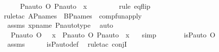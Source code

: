 \begin{isabellebody}
\ \isamarkupfalse%
\ {\isachardoublequoteopen}{\isachardot}{\kern0pt}{\isachardot}{\kern0pt}{\isachardot}{\kern0pt}\ {\isacharequal}{\kern0pt}\ {\isacharparenleft}{\kern0pt}Pn{\isacharunderscore}{\kern0pt}auto{\isacharparenleft}{\kern0pt}{\isasympi}{\isacharparenright}{\kern0pt}\ O\ Pn{\isacharunderscore}{\kern0pt}auto{\isacharparenleft}{\kern0pt}{\isasymtau}{\isacharparenright}{\kern0pt}{\isacharparenright}{\kern0pt}\ {\isacharbackquote}{\kern0pt}\ x{\isachardoublequoteclose}\ \isanewline
\ \ \ \ \ \ \isamarkupfalse%
\ {\isacharparenleft}{\kern0pt}rule\ eq{\isacharunderscore}{\kern0pt}flip{\isacharparenright}{\kern0pt}\ \isamarkupfalse%
{\isacharparenleft}{\kern0pt}rule{\isacharunderscore}{\kern0pt}tac\ A{\isacharequal}{\kern0pt}P{\isacharunderscore}{\kern0pt}names\ \ B{\isacharequal}{\kern0pt}P{\isacharunderscore}{\kern0pt}names\ \ comp{\isacharunderscore}{\kern0pt}fun{\isacharunderscore}{\kern0pt}apply{\isacharparenright}{\kern0pt}\ \isanewline
\ \ \ \ \ \ \isamarkupfalse%
\ assms\ xpname\ Pn{\isacharunderscore}{\kern0pt}auto{\isacharunderscore}{\kern0pt}type\ \isamarkupfalse%
\ auto\ \isanewline
\ \ \ \ \isamarkupfalse%
\ \isamarkupfalse%
\ {\isachardoublequoteopen}\ Pn{\isacharunderscore}{\kern0pt}auto{\isacharparenleft}{\kern0pt}{\isasympi}\ O\ {\isasymtau}{\isacharparenright}{\kern0pt}\ {\isacharbackquote}{\kern0pt}\ x\ {\isacharequal}{\kern0pt}\ {\isacharparenleft}{\kern0pt}Pn{\isacharunderscore}{\kern0pt}auto{\isacharparenleft}{\kern0pt}{\isasympi}{\isacharparenright}{\kern0pt}\ O\ Pn{\isacharunderscore}{\kern0pt}auto{\isacharparenleft}{\kern0pt}{\isasymtau}{\isacharparenright}{\kern0pt}{\isacharparenright}{\kern0pt}\ {\isacharbackquote}{\kern0pt}\ x\ {\isachardoublequoteclose}\ \isamarkupfalse%
\ simp\ \isanewline
\ \ \isamarkupfalse%
\isanewline
\isanewline
\ \ \isamarkupfalse%
\ {\isachardoublequoteopen}is{\isacharunderscore}{\kern0pt}P{\isacharunderscore}{\kern0pt}auto{\isacharparenleft}{\kern0pt}{\isasympi}\ O\ {\isasymtau}{\isacharparenright}{\kern0pt}{\isachardoublequoteclose}\ \isanewline
\ \ \ \ \isamarkupfalse%
\ assms\isanewline
\ \ \ \ \isamarkupfalse%
\ is{\isacharunderscore}{\kern0pt}P{\isacharunderscore}{\kern0pt}auto{\isacharunderscore}{\kern0pt}def\ \isamarkupfalse%
\ {\isacharparenleft}{\kern0pt}rule{\isacharunderscore}{\kern0pt}tac\ conjI{\isacharparenright}{\kern0pt}\ \isanewline

\end{isabellebody}
